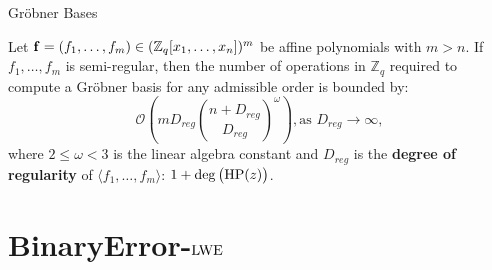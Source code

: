 \documentclass[10pt]{beamer}
\newcommand{\Zq}{\ensuremath{\mathbb{Z}_q}}
\newcommand\LWE{\ensuremath{{\rm LWE}}\xspace}
\begin{document}
\begin{frame}[allowframebreaks]{Gröbner Bases}
\framebreak

\begin{lemma}\label{GBb}
Let ${\bf f}=(f_1 ,\ldots,f_{m}) \in (\Zq[x_1,\ldots,x_n])^m$  be affine polynomials with $m >n$.
If $f_1 ,\ldots,f_{m}$ is semi-regular, then the number of operations in $\Zq$ 
required to compute a Gr\"obner basis for any admissible order is bounded by:
\begin{equation}\label{cplxgb}
\mathcal{O} \left(m D_{{reg}}  {n + D_{{reg}} \choose D_{{reg}}}^\omega \right),
\mbox{as } D_{{reg}} \to \infty,
\end{equation}
where $2 \leq \omega < 3$ is the linear algebra constant and $D_{{reg}}$ is the \textbf{degree of regularity} of $\langle f_1 ,\ldots,f_{m} \rangle$: $1+\deg\big({\rm HP}(z)\big)$.
\end{lemma}

\end{frame}

\section{BinaryError-\LWE}
\end{document}
